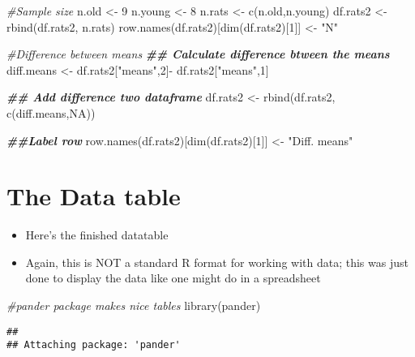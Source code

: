 \documentclass[
]{book}
\newenvironment{Shaded}{\begin{snugshade}}{\end{snugshade}}
\newcommand{\CommentTok}[1]{\textcolor[rgb]{0.56,0.35,0.01}{\textit{#1}}}
\newcommand{\ConstantTok}[1]{\textcolor[rgb]{0.00,0.00,0.00}{#1}}
\newcommand{\DecValTok}[1]{\textcolor[rgb]{0.00,0.00,0.81}{#1}}
\newcommand{\DocumentationTok}[1]{\textcolor[rgb]{0.56,0.35,0.01}{\textbf{\textit{#1}}}}
\newcommand{\FunctionTok}[1]{\textcolor[rgb]{0.00,0.00,0.00}{#1}}
\newcommand{\NormalTok}[1]{#1}
\newcommand{\OtherTok}[1]{\textcolor[rgb]{0.56,0.35,0.01}{#1}}
\newcommand{\SpecialCharTok}[1]{\textcolor[rgb]{0.00,0.00,0.00}{#1}}
\newcommand{\StringTok}[1]{\textcolor[rgb]{0.31,0.60,0.02}{#1}}
\providecommand{\tightlist}{%
  \setlength{\itemsep}{0pt}\setlength{\parskip}{0pt}}
\begin{document}
\begin{Shaded}
\begin{Highlighting}[]
\CommentTok{\#Sample size}
\NormalTok{n.old }\OtherTok{\textless{}{-}} \DecValTok{9}
\NormalTok{n.young }\OtherTok{\textless{}{-}} \DecValTok{8}
\NormalTok{n.rats }\OtherTok{\textless{}{-}} \FunctionTok{c}\NormalTok{(n.old,n.young)}
\NormalTok{df.rats2 }\OtherTok{\textless{}{-}} \FunctionTok{rbind}\NormalTok{(df.rats2, n.rats)}
\FunctionTok{row.names}\NormalTok{(df.rats2)[}\FunctionTok{dim}\NormalTok{(df.rats2)[}\DecValTok{1}\NormalTok{]] }\OtherTok{\textless{}{-}} \StringTok{"N"}


\CommentTok{\#Difference between means}
\DocumentationTok{\#\# Calculate difference btween the means}
\NormalTok{diff.means }\OtherTok{\textless{}{-}}\NormalTok{ df.rats2[}\StringTok{"means"}\NormalTok{,}\DecValTok{2}\NormalTok{]}\SpecialCharTok{{-}}
\NormalTok{  df.rats2[}\StringTok{"means"}\NormalTok{,}\DecValTok{1}\NormalTok{]}

\DocumentationTok{\#\# Add difference two dataframe}
\NormalTok{df.rats2 }\OtherTok{\textless{}{-}} \FunctionTok{rbind}\NormalTok{(df.rats2, }\FunctionTok{c}\NormalTok{(diff.means,}\ConstantTok{NA}\NormalTok{))}

\DocumentationTok{\#\#Label row}
\FunctionTok{row.names}\NormalTok{(df.rats2)[}\FunctionTok{dim}\NormalTok{(df.rats2)[}\DecValTok{1}\NormalTok{]] }\OtherTok{\textless{}{-}} \StringTok{"Diff. means"}
\end{Highlighting}
\end{Shaded}

\hypertarget{the-data-table}{%
\section{The Data table}\label{the-data-table}}

\begin{itemize}
\tightlist
\item
  Here's the finished datatable
\item
  Again, this is NOT a standard R format for working with data; this was just done to display the data like one might do in a spreadsheet
\end{itemize}

\begin{Shaded}
\begin{Highlighting}[]
\CommentTok{\#pander package makes nice tables}
\FunctionTok{library}\NormalTok{(pander)}
\end{Highlighting}
\end{Shaded}

\begin{verbatim}
## 
## Attaching package: 'pander'
\end{verbatim}
\end{document}
